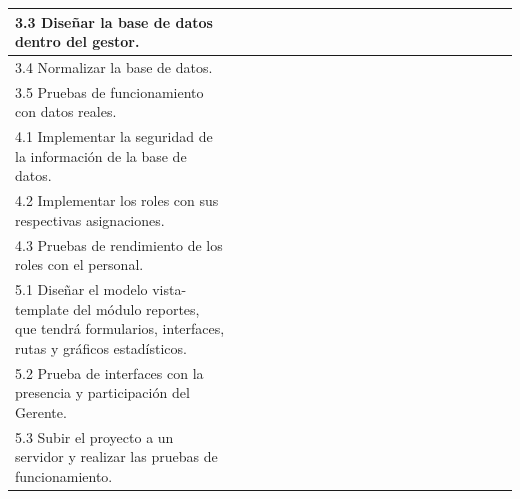 \documentclass[12pt,letterpaper]{article}
\begin{document}
\begin{spacing}{1}
\begin{longtable}{|p{4cm}|c|c|c|c|c|c|c|c|c|c|c|c|c|c|c|c|c|c|c|c|}
\hline 
3.3 Diseñar la base de datos dentro del gestor. & & & & & & & & & & & \cellcolor{saffron} & \cellcolor{saffron} & & & & & & & & \\ 
\hline 
3.4 Normalizar la base de datos. & & & & & & & & & & & & & \cellcolor{saffron} & & & & & & & \\ 
\hline 
3.5 Pruebas de funcionamiento con datos reales. & & & & & & & & & & & & & \cellcolor{saffron} & & & & & & & \\ 
\hline 
4.1 Implementar la seguridad de la información de la base de datos. & & & & & & & & & & & & & \cellcolor{darkseagreen} & \cellcolor{darkseagreen} & & & & & & \\ 
\hline 
4.2 Implementar los roles con sus respectivas asignaciones. & & & & & & & & & & & & & & & \cellcolor{darkseagreen} & & & & & \\ 
\hline 
4.3 Pruebas de rendimiento de los roles con el personal. & & & & & & & & & & & & & & & & \cellcolor{darkseagreen} & & & & \\ 
\hline 
5.1 Diseñar el modelo vista-template del módulo reportes, que tendrá formularios, interfaces, rutas y gráficos estadísticos. & & & & & & & & & & & & & & & & & \cellcolor{pastelred} & & & \\ 
\hline 
5.2 Prueba de interfaces con la presencia y participación del Gerente. & & & & & & & & & & & & & & & & & & \cellcolor{pastelred} & & \\ 
\hline 
5.3 Subir el proyecto a un servidor y realizar las pruebas de funcionamiento. & & & & & & & & & & & & & & & & & & & \cellcolor{pastelred} & \cellcolor{pastelred} \\ 
\hline 

\end{longtable} 
\end{spacing}
\end{document}
